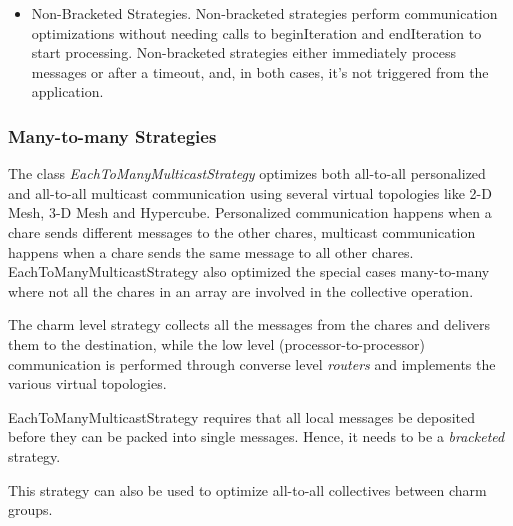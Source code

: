 {\begin{itemize}
\begin{alltt}
ComlibEnd(dproxy);
\end{alltt}

\item Non-Bracketed Strategies. Non-bracketed strategies perform communication
optimizations without needing calls to beginIteration and endIteration to start
processing. Non-bracketed strategies either immediately process messages or
after a timeout, and, in both cases, it's not triggered from the application.

\end{itemize}


\subsubsection{Many-to-many Strategies}

The class {\em EachToManyMulticastStrategy} optimizes both all-to-all
personalized and all-to-all multicast communication using several virtual
topologies like 2-D Mesh, 3-D Mesh and Hypercube. Personalized communication
happens when a chare sends different messages to the other chares, multicast
communication happens when a chare sends the same message to all other chares.
EachToManyMulticastStrategy also optimized the special cases many-to-many where
not all the chares in an array are involved in the collective operation.

The charm level strategy collects all the messages from the chares and delivers
them to the destination, while the low level (processor-to-processor)
communication is performed through converse level {\em routers} and
implements the various virtual topologies.



EachToManyMulticastStrategy requires that all local messages be deposited
before they can be packed into single messages. Hence, it needs to be a {\em
bracketed} strategy.

This strategy can also be used to optimize all-to-all collectives between charm
groups.

}
